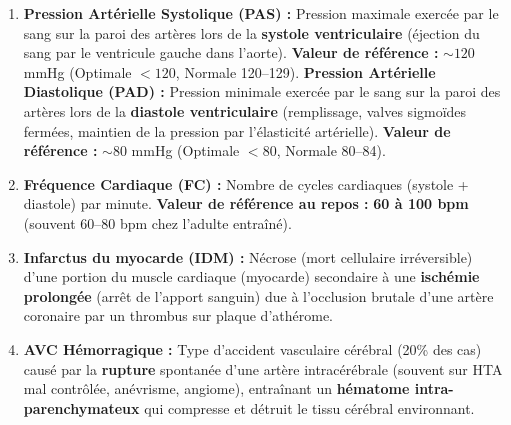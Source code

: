 \documentclass[11pt]{article}
\begin{document}
\begin{corrige}
\begin{enumerate}
    \item \textbf{Pression Artérielle Systolique (PAS) :} Pression maximale exercée par le sang sur la paroi des artères lors de la \textbf{systole ventriculaire} (éjection du sang par le ventricule gauche dans l'aorte). \textbf{Valeur de référence :} $\sim 120$ mmHg (Optimale $< 120$, Normale 120--129).
    \textbf{Pression Artérielle Diastolique (PAD) :} Pression minimale exercée par le sang sur la paroi des artères lors de la \textbf{diastole ventriculaire} (remplissage, valves sigmoïdes fermées, maintien de la pression par l'élasticité artérielle). \textbf{Valeur de référence :} $\sim 80$ mmHg (Optimale $< 80$, Normale 80--84).
    \item \textbf{Fréquence Cardiaque (FC) :} Nombre de cycles cardiaques (systole + diastole) par minute. \textbf{Valeur de référence au repos :} \textbf{60 à 100 bpm} (souvent 60--80 bpm chez l'adulte entraîné).
    \item \textbf{Infarctus du myocarde (IDM) :} Nécrose (mort cellulaire irréversible) d'une portion du muscle cardiaque (myocarde) secondaire à une \textbf{ischémie prolongée} (arrêt de l'apport sanguin) due à l'occlusion brutale d'une artère coronaire par un thrombus sur plaque d'athérome.
    \item \textbf{AVC Hémorragique :} Type d'accident vasculaire cérébral (20\% des cas) causé par la \textbf{rupture} spontanée d'une artère intracérébrale (souvent sur HTA mal contrôlée, anévrisme, angiome), entraînant un \textbf{hématome intra-parenchymateux} qui compresse et détruit le tissu cérébral environnant.
\end{enumerate}
\end{corrige}
\end{document}
